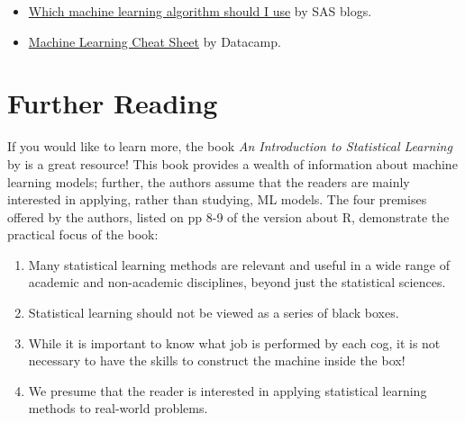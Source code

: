 \documentclass[
]{book}
\providecommand{\tightlist}{%
  \setlength{\itemsep}{0pt}\setlength{\parskip}{0pt}}
\begin{document}
\begin{itemize}
\tightlist
\item
  \href{https://blogs.sas.com/content/subconsciousmusings/2020/12/09/machine-learning-algorithm-use/}{Which machine learning algorithm should I use} by SAS blogs.
\item
  \href{https://www.datacamp.com/cheat-sheet/machine-learning-cheat-sheet?utm_source=google\&utm_medium=paid_search\&utm_campaignid=19589720830\&utm_adgroupid=157098107695\&utm_device=c\&utm_keyword=\&utm_matchtype=\&utm_network=g\&utm_adpostion=\&utm_creative=698229375346\&utm_targetid=dsa-2264919291829\&utm_loc_interest_ms=\&utm_loc_physical_ms=9009732\&utm_content=DSA~blog~Julia\&utm_campaign=230119_1-sea~dsa~tofu_2-b2c_3-us_4-prc_5-na_6-na_7-le_8-pdsh-go_9-na_10-na_11-na-may24\&gad_source=1\&gclid=Cj0KCQjw6PGxBhCVARIsAIumnWai3I4X4UtrhM_2dA1pUpmAmC-iErsp57Cv6p4fEQugIVbGrx1VT2YaAsr7EALw_wcB}{Machine Learning Cheat Sheet} by Datacamp.
\end{itemize}

\hypertarget{further-reading}{%
\section{Further Reading}\label{further-reading}}

If you would like to learn more, the book \emph{An Introduction to Statistical Learning} by \citet{james2013introduction} is a great resource! This book provides a wealth of information about machine learning models; further, the authors assume that the readers are mainly interested in applying, rather than studying, ML models. The four premises offered by the authors, listed on pp 8-9 of the version about R, demonstrate the practical focus of the book:

\begin{enumerate}
\def\labelenumi{\arabic{enumi}.}
\tightlist
\item
  Many statistical learning methods are relevant and useful in a wide range of academic and non-academic disciplines, beyond just the statistical sciences.
\item
  Statistical learning should not be viewed as a series of black boxes.
\item
  While it is important to know what job is performed by each cog, it is not necessary to have the skills to construct the machine inside the box!
\item
  We presume that the reader is interested in applying statistical learning methods to real-world problems.
\end{enumerate}
\end{document}
